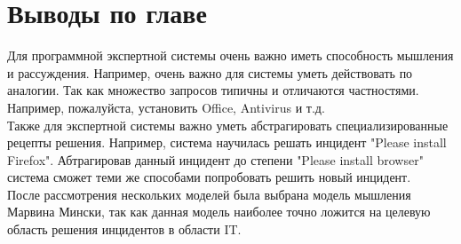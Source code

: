 \section{Выводы по главе}
Для программной экспертной системы очень важно иметь способность мышления и рассуждения. Например, очень важно  для системы уметь действовать по аналогии. Так как множество запросов типичны и отличаются частностями. Например, пожалуйста, установить Office, Antivirus и т.д. \\
Также для экспертной системы важно уметь абстрагировать специализированные рецепты решения. Например, система научилась решать инцидент "Please install Firefox". Абтрагировав данный инцидент до степени "Please install browser" система сможет теми же способами попробовать решить новый инцидент.\\
После рассмотрения нескольких моделей была выбрана модель мышления Марвина Мински, так как данная модель наиболее точно ложится на целевую область решения инцидентов в области IT.




\clearpage
